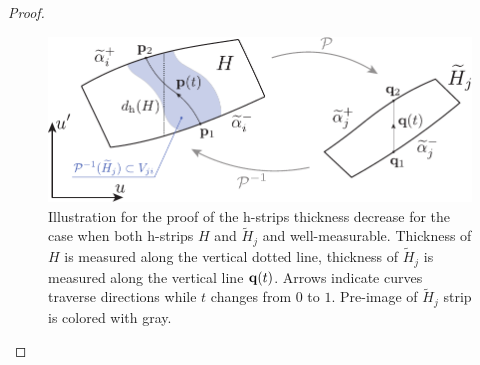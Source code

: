 \begin{proof}
	\begin{figure}[h]
	\centering
		\includegraphics[scale = 1]{pic/thickness of h-strip (a)}
		\caption{
			Illustration for the proof of the h-strips thickness decrease for the case when both h-strips $H$ and $\widetilde{H}_j$ and well-measurable.
			Thickness of $H$ is measured along the vertical dotted line, thickness of $\widetilde{H}_j$ is measured along the vertical line $\vb{q}(t)$.
			Arrows indicate curves traverse directions while $t$ changes from $0$ to $1$.
			Pre-image of $\widetilde{H}_j$ strip is colored with gray.
		}
	\label{fig:thickness-of-h-strip-a}
	\end{figure}
	

\end{proof}
